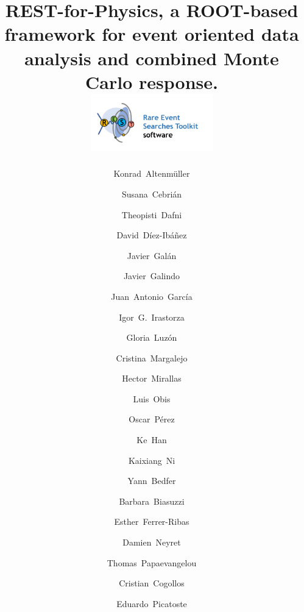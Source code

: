 \documentclass[article]{elsarticle}
\begin{document}
\begin{frontmatter}

\title{REST-for-Physics, a ROOT-based framework for event oriented data analysis and combined Monte Carlo response.\\ \includegraphics[height=25mm]{RESTlogoFull.png}}


\author{Konrad~Altenm\"uller}
\author{Susana~Cebri\'an}
\author{Theopisti~Dafni}
\author{David~D\'iez-Ib\'añez}
\author{Javier~Gal\'an}
\author{Javier~Galindo}
\author{Juan~Antonio~Garc\'ia}
\author{Igor~G.~Irastorza}
\author{Gloria~Luz\'on}
\author{Cristina~Margalejo}
\author{Hector~Mirallas}
\author{Luis~Obis}
\author{Oscar~P\'erez}

\address{Center for Astroparticles and High Energy Physics (CAPA), Universidad de Zaragoza, 50009 Zaragoza, Spain}

\author{Ke~Han}
\author{Kaixiang~Ni}
\address{INPAC; Shanghai Laboratory for Particle Physics and Cosmology; Key Laboratory for Particle Astrophysics and Cosmology (MOE), School of Physics and Astronomy, Shanghai Jiao Tong University, Shanghai 200240, China}


\author{Yann~Bedfer}
\author{Barbara~Biasuzzi}
\author{Esther~Ferrer-Ribas}
\author{Damien~Neyret}
\author{Thomas~Papaevangelou}
\address{IRFU, CEA, Universit\'e Paris-Saclay, F-91191 Gif-sur-Yvette, France}

\author{Cristian~Cogollos}
\author{Eduardo~Picatoste}
\address{Institut de Ci\`encies del Cosmos, Universitat de Barcelona, Barcelona, Spain}
\address{Departament de F\'isica Qu\`antica i Astrof\'isica, Universitat de Barcelona, Barcelona, Spain}





\end{frontmatter}
\end{document}
